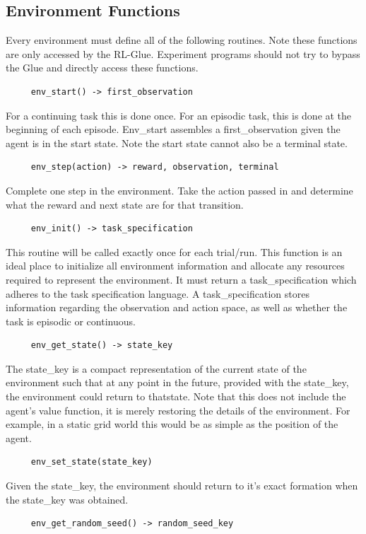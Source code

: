 \documentclass[11pt]{article}
\begin{document}
\subsection{Environment Functions}
\label{Eref}
Every environment must define all of the following routines. Note these functions are only accessed by the RL-Glue. Experiment programs should not try to bypass the Glue and directly access these functions.
\begin{verbatim}
     env_start() -> first_observation\end{verbatim}
For a continuing task this is done once. For an episodic task, this is done at the beginning of each episode. Env\_start assembles a first\_observation given the agent is in the start state. Note the start state cannot also be a terminal state.
\begin{verbatim}
     env_step(action) -> reward, observation, terminal\end{verbatim}
Complete one step in the environment. Take the action passed in and determine what the reward and next state are for that transition.
\begin{verbatim}
     env_init() -> task_specification\end{verbatim}
This routine will be called exactly once for each trial/run. This function is an ideal place to initialize all environment information and allocate any resources required to represent the environment. It must return a task\_specification which adheres to the task specification language. A task\_specification stores information regarding the observation and action space, as well as whether the task is episodic or continuous.
\begin{verbatim}
     env_get_state() -> state_key\end{verbatim}
The state\_key is a compact representation of the current state of the environment such that at any point in the future, provided with the state\_key, the environment could return to thatstate. Note that this does not include the agent's value function, it is merely restoring the details of the environment. For example, in a static grid world this would be as simple as the position of the agent.
\begin{verbatim}
     env_set_state(state_key)\end{verbatim}
Given the state\_key, the environment should return to it's exact formation when the state\_key was obtained. 
\begin{verbatim}
     env_get_random_seed() -> random_seed_key\end{verbatim}
\end{document}
